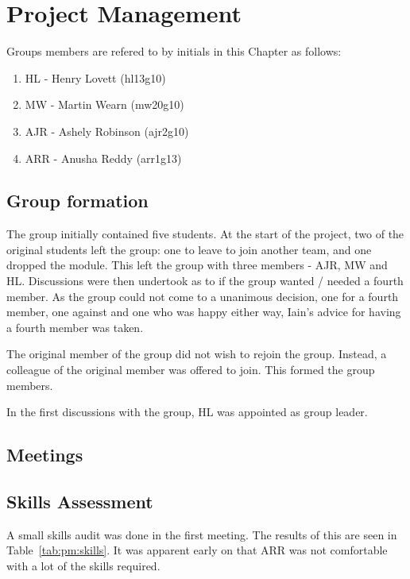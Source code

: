
\chapter{Project Management}

Groups members are refered to by initials in this Chapter as follows:
\begin{enumerate}
\item HL - Henry Lovett (hl13g10)
\item MW - Martin Wearn (mw20g10)
\item AJR - Ashely Robinson (ajr2g10)
\item ARR - Anusha Reddy (arr1g13)
\end{enumerate}

\section{Group formation}

The group initially contained five students. 
At the start of the project, two of the original students left the group: one to leave to join another team, and one dropped the module.
This left the group with three members - AJR, MW and HL. 
Discussions were then undertook as to if the group wanted / needed a fourth member. 
As the group could not come to a unanimous decision, one for a fourth member, one against and one who was happy either way, Iain's advice for having a fourth member was taken. 

The original member of the group did not wish to rejoin the group.
Instead, a colleague of the original member was offered to join.
This formed the group members. 

In the first discussions with the group, HL was appointed as group leader. 

\section{Meetings}


\section{Skills Assessment}

A small skills audit was done in the first meeting. 
The results of this are seen in Table~\ref{tab:pm:skills}.
It was apparent early on that ARR was not comfortable with a lot of the skills required.


